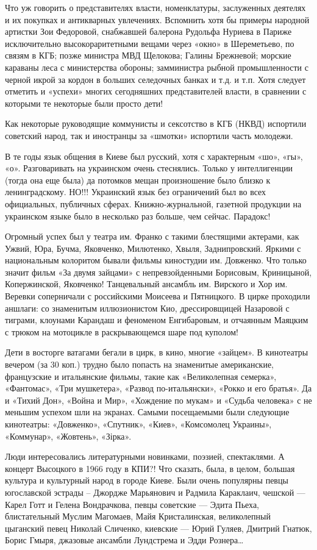 Что уж говорить о представителях власти, номенклатуры, заслуженных деятелях и
их покупках и антикварных увлечениях. Вспомнить хотя бы примеры народной
артистки Зои Федоровой, снабжавшей балерона Рудольфа Нуриева в Париже
исключительно высокораритетными вещами через «окно» в Шереметьево, по связям в
КГБ; позже министра МВД Щелокова; Галины Брежневой; морские караваны леса с
министерства обороны; замминистра рыбной промышленности с черной икрой за
кордон в больших селедочных банках и т.д. и т.п. Хотя следует отметить и
«успехи» многих сегодняшних представителей власти, в сравнении с которыми те
некоторые были просто дети! 

Как некоторые руководящие коммунисты и сексотство в КГБ (НКВД) испортили
советский народ, так и иностранцы за «шмотки» испортили часть молодежи.

В те годы язык общения в Киеве был русский, хотя с характерным «шо», «гы», «о».
Разговаривать на украинском очень стеснялись. Только у интеллигенции (тогда она
еще была) да потомков мещан произношение было близко к ленинградскому. НО!!!
Украинский язык без ограничений был во всех официальных, публичных сферах.
Книжно-журнальной, газетной продукции на украинском языке было в несколько раз
больше, чем сейчас. Парадокс!

Огромный успех был у театра им. Франко с такими блестящими актерами, как Ужвий,
Юра, Бучма, Яковченко, Милютенко, Хвыля, Заднипровский. Яркими с национальным
колоритом бывали фильмы киностудии им. Довженко. Что только значит фильм «За
двумя зайцами» с непревзойденными Борисовым, Криницыной, Копержинской,
Яковченко! Танцевальный ансамбль им. Вирского и Хор им. Веревки соперничали с
российскими Моисеева и Пятницкого. В цирке проходили аншлаги: со знаменитым
иллюзионистом Кио, дрессировщицей Назаровой с тиграми, клоунами Карандаш и
феноменом Енгибаровым, и отчаянным Маяцким с трюком на мотоцикле в
раскрывающемся шаре под куполом! 

Дети в восторге ватагами бегали в цирк, в кино, многие «зайцем». В кинотеатры
вечером (за 30 коп.) трудно было попасть на знаменитые американские,
французские и итальянские фильмы, такие как «Великолепная семерка», «Фантомас»,
«Три мушкетера», «Развод по-итальянски», «Рокко и его братья». Да и «Тихий
Дон», «Война и Мир», «Хождение по мукам» и «Судьба человека» с не меньшим
успехом шли на экранах. Самыми посещаемыми были следующие кинотеатры:
«Довженко», «Спутник», «Киев», «Комсомолец Украины», «Коммунар», «Жовтень»,
«Зірка». 

Люди интересовались литературными новинками, поэзией, спектаклями. А концерт
Высоцкого в 1966 году в КПИ?! Что сказать, была, в целом, большая культура и
культурный народ в городе Киеве. Были очень популярны певцы югославской эстрады
– Джордже Марьянович и Радмила Караклаич, чешской --- Карел Готт и Гелена
Вондрачкова, певцы советские --- Эдита Пьеха, блистательный Муслим Магомаев, Майя
Кристалинская, великолепный цыганский певец Николай Сличенко, киевские --- Юрий
Гуляев, Дмитрий Гнатюк, Борис Гмыря, джазовые ансамбли Лундстрема и Эдди
Рознера…


